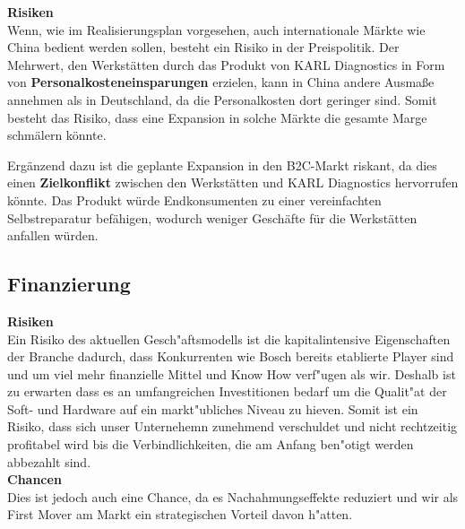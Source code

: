\textbf{Risiken} \\
Wenn, wie im Realisierungsplan vorgesehen, auch internationale M\"arkte wie China bedient werden sollen, besteht ein Risiko in der Preispolitik. Der Mehrwert, den Werkst\"atten durch das Produkt von KARL Diagnostics in Form von \textbf{Personalkosteneinsparungen} erzielen, kann in China andere Ausma\ss e annehmen als in Deutschland, da die Personalkosten dort geringer sind. Somit besteht das Risiko, dass eine Expansion in solche M\"arkte die gesamte Marge schm\"alern k\"onnte.

Erg\"anzend dazu ist die geplante Expansion in den \ac{B2C}-Markt riskant, da dies einen \textbf{Zielkonflikt} zwischen den Werkst\"atten und KARL Diagnostics hervorrufen k\"onnte. Das Produkt w\"urde Endkonsumenten zu einer vereinfachten Selbstreparatur bef\"ahigen, wodurch weniger Gesch\"afte f\"ur die Werkst\"atten anfallen w\"urden. \\



\subsection{Finanzierung}

\textbf{Risiken} \\
Ein Risiko des aktuellen Gesch"aftsmodells ist die kapitalintensive Eigenschaften der Branche dadurch, dass Konkurrenten wie Bosch bereits etablierte Player sind und um viel mehr finanzielle Mittel und Know How verf"ugen als wir. Deshalb ist zu erwarten dass es an umfangreichen Investitionen bedarf um die Qualit"at der Soft- und Hardware auf ein markt"ubliches Niveau zu hieven.
Somit ist ein Risiko, dass sich unser Unternehemn zunehmend verschuldet und nicht rechtzeitig profitabel wird bis die Verbindlichkeiten, die am Anfang ben"otigt werden abbezahlt sind. \\
\textbf{Chancen} \\
Dies ist jedoch auch eine Chance, da es Nachahmungseffekte reduziert und wir als First Mover am Markt ein strategischen Vorteil davon h"atten. \\


